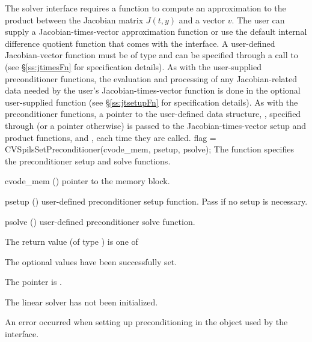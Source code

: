 The {\cvspils} solver interface requires a function to compute an
approximation to the product between the Jacobian matrix $J(t,y)$ and
a vector $v$. The user can supply a Jacobian-times-vector
approximation function or use the default internal difference quotient function
that comes with the {\cvspils} interface.  A user-defined Jacobian-vector
function must be of type  and 
can be specified through a call to  (see
\S\ref{ss:jtimesFn} for specification details).
As with the user-supplied preconditioner functions, the evaluation and
processing of any Jacobian-related data needed by the user's
Jacobian-times-vector function is done in the optional user-supplied
function  (see \S\ref{ss:jtsetupFn} for specification
details).  As with the preconditioner functions, a pointer to the user-defined
data structure, , specified through
 (or a  pointer otherwise) is passed to
the Jacobian-times-vector setup and product functions,  and
, each time they are called.
{
  flag = CVSpilsSetPreconditioner(cvode\_mem, psetup, psolve);
}
{
  The function  specifies the preconditioner
  setup and solve functions.
}
{
  \begin{args}
  \item[cvode\_mem] ()
    pointer to the {\cvode} memory block.
  \item[psetup] ()
    user-defined preconditioner setup function.
    Pass  if no setup is necessary.
  \item[psolve] ()
    user-defined preconditioner solve function.
  \end{args}
}
{
  The return value  (of type ) is one of
  \begin{args}
  \item[\Id{CVSPILS\_SUCCESS}] 
    The optional values have been successfully set.
  \item[\Id{CVSPILS\_MEM\_NULL}]
    The  pointer is .
  \item[\Id{CVSPILS\_LMEM\_NULL}]
    The {\cvspils} linear solver has not been initialized.
  \item[\Id{CVSPILS\_SUNLS\_FAIL}]
    An error occurred when setting up preconditioning in the
    {\sunlinsol} object used by the {\cvspils} interface.
  \end{args}
}
